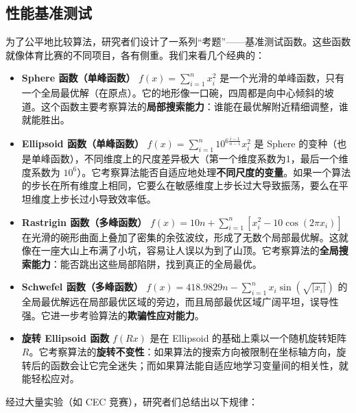 \documentclass[lang=cn,zihao=-4,a4paper,fontset=windows]{beautybook}
\begin{document}
\subsection{性能基准测试}

为了公平地比较算法，研究者们设计了一系列“考题”——基准测试函数。这些函数就像体育比赛的不同项目，各有侧重。我们来看几个经典的：
\begin{itemize}
\item \textbf{Sphere 函数（单峰函数）} $f(x) = \sum_{i=1}^n x_i^2$ 是一个光滑的单峰函数，只有一个全局最优解（在原点）。它的地形像一口碗，四周都是向中心倾斜的坡道。这个函数主要考察算法的\textbf{局部搜索能力}：谁能在最优解附近精细调整，谁就能胜出。
\item \textbf{Ellipsoid 函数（单峰函数）} $f(x) = \sum_{i=1}^n 10^{6\frac{i-1}{n-1}} x_i^2$ 是 Sphere 的变种（也是单峰函数），不同维度上的尺度差异极大（第一个维度系数为1，最后一个维度系数为 $10^6$）。它考察算法能否自适应地处理\textbf{不同尺度的变量}。如果一个算法的步长在所有维度上相同，它要么在敏感维度上步长过大导致振荡，要么在平坦维度上步长过小导致效率低。
\item \textbf{Rastrigin 函数（多峰函数）} $f(x) = 10n + \sum_{i=1}^n [x_i^2 - 10\cos(2\pi x_i)]$ 在光滑的碗形曲面上叠加了密集的余弦波纹，形成了无数个局部最优解。这就像在一座大山上布满了小坑，容易让人误以为到了山顶。它考察算法的\textbf{全局搜索能力}：能否跳出这些局部陷阱，找到真正的全局最优。
\item \textbf{Schwefel 函数（多峰函数）} $f(x) = 418.9829n - \sum_{i=1}^n x_i \sin(\sqrt{|x_i|})$ 的全局最优解远在局部最优区域的旁边，而且局部最优区域广阔平坦，误导性强。它进一步考验算法的\textbf{欺骗性应对能力}。
\item \textbf{旋转 Ellipsoid 函数} $f(Rx)$ 是在 Ellipsoid 的基础上乘以一个随机旋转矩阵 $R$。它考察算法的\textbf{旋转不变性}：如果算法的搜索方向被限制在坐标轴方向，旋转后的函数会让它完全迷失；而如果算法能自适应地学习变量间的相关性，就能轻松应对。
\end{itemize}

经过大量实验（如 CEC 竞赛），研究者们总结出以下规律：
\end{document}
